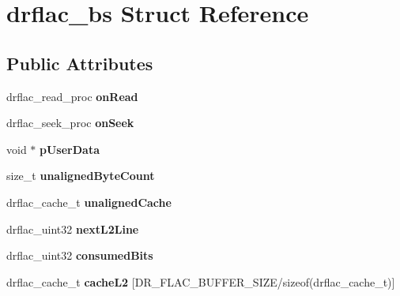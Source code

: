 \hypertarget{structdrflac__bs}{}\section{drflac\+\_\+bs Struct Reference}
\label{structdrflac__bs}
\subsection*{Public Attributes}
\begin{DoxyCompactItemize}
\item 
\mbox{\label{structdrflac__bs_a50c7c79519b6361aeb3359e0a6976cd1}} 
drflac\+\_\+read\+\_\+proc {\bfseries on\+Read}
\item 
\mbox{\label{structdrflac__bs_a2b3f98bd08b0c10b4973f07490e68b4d}} 
drflac\+\_\+seek\+\_\+proc {\bfseries on\+Seek}
\item 
\mbox{\label{structdrflac__bs_ab77ba4df7fa728dd3efe8f3706fcdc2e}} 
void $\ast$ {\bfseries p\+User\+Data}
\item 
\mbox{\label{structdrflac__bs_ab934d8140dbe0361931fe3cec2794f2d}} 
size\+\_\+t {\bfseries unaligned\+Byte\+Count}
\item 
\mbox{\label{structdrflac__bs_a8d7898d20ffc384396f24aaf8f85360f}} 
drflac\+\_\+cache\+\_\+t {\bfseries unaligned\+Cache}
\item 
\mbox{\label{structdrflac__bs_a9814f0137b4a1643f1d92f4b730395df}} 
drflac\+\_\+uint32 {\bfseries next\+L2\+Line}
\item 
\mbox{\label{structdrflac__bs_a0bd502ee71e583220d89b54e0dbc4482}} 
drflac\+\_\+uint32 {\bfseries consumed\+Bits}
\item 
\mbox{\label{structdrflac__bs_a47ae286de411c910b64f97f84085ceb3}} 
drflac\+\_\+cache\+\_\+t {\bfseries cache\+L2} \mbox{[}D\+R\+\_\+\+F\+L\+A\+C\+\_\+\+B\+U\+F\+F\+E\+R\+\_\+\+S\+I\+ZE/sizeof(drflac\+\_\+cache\+\_\+t)\mbox{]}
\item 
\mbox{\label{structdrflac__bs_adfc58bf7ae778f4c96bac0a620aeb3b5}} 

\end{DoxyCompactItemize}
